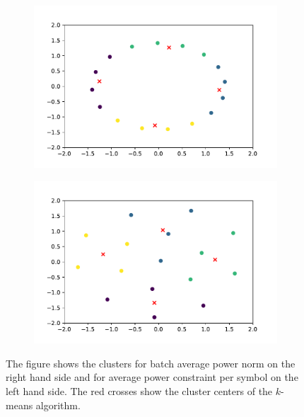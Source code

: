 \documentclass[conference]{IEEEtran}
\begin{document}
\begin{figure}
\centering
\begin{subfigure}{0.25\textwidth}
  \centering
  \includegraphics[width=\linewidth]{const_circle_means.pdf}
\end{subfigure}%
\begin{subfigure}{0.25\textwidth}
  \centering
  \includegraphics[width=\linewidth]{const_avg_means.pdf}
\end{subfigure}
\caption{The figure shows the clusters for batch average power norm on the right hand side and for average power constraint per symbol on the left hand side. The red crosses show the cluster centers of the $k$-means algorithm.}
\label{fig:Encoding clusters}
\end{figure}
\end{document}
